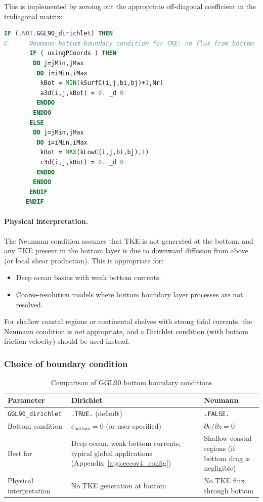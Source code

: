 \documentclass[12pt,letterpaper]{article}
\begin{document}
This is implemented by zeroing out the appropriate off-diagonal coefficient in the tridiagonal matrix:

\begin{lstlisting}[language=Fortran,caption={(ggl90\_calc.F:L722--739) Neumann bottom BC}]
      IF (.NOT.GGL90_dirichlet) THEN
C      Neumann bottom boundary condition for TKE: no flux from bottom
       IF ( usingPCoords ) THEN
        DO j=jMin,jMax
         DO i=iMin,iMax
          kBot = MIN(kSurfC(i,j,bi,bj)+1,Nr)
          a3d(i,j,kBot) = 0. _d 0
         ENDDO
        ENDDO
       ELSE
        DO j=jMin,jMax
         DO i=iMin,iMax
          kBot = MAX(kLowC(i,j,bi,bj),1)
          c3d(i,j,kBot) = 0. _d 0
         ENDDO
        ENDDO
       ENDIF
      ENDIF
\end{lstlisting}

\paragraph{Physical interpretation.} The Neumann condition assumes that TKE is not generated at the bottom, and any TKE present in the bottom layer is due to downward diffusion from above (or local shear production). This is appropriate for:
\begin{itemize}
\item Deep ocean basins with weak bottom currents.
\item Coarse-resolution models where bottom boundary layer processes are not resolved.
\end{itemize}

For shallow coastal regions or continental shelves with strong tidal currents, the Neumann condition is \emph{not} appropriate, and a Dirichlet condition (with bottom friction velocity) should be used instead.

\subsubsection{Choice of boundary condition}

\begin{table}[ht]
\centering
\caption{Comparison of GGL90 bottom boundary conditions}
\label{tab:bottom_bc}
\begin{tabular}{lp{5cm}p{5cm}}
\toprule
\textbf{Parameter} & \textbf{Dirichlet} & \textbf{Neumann} \\
\midrule
\verb|GGL90_dirichlet| & \verb|.TRUE.| (default) & \verb|.FALSE.| \\
\addlinespace
Bottom condition & $e_{\text{bottom}} = 0$ (or user-specified) & $\partial e/\partial z = 0$ \\
\addlinespace
Best for & Deep ocean, weak bottom currents, typical global applications (Appendix~\ref{app:eccov4_config}) & Shallow coastal regions (if bottom drag is negligible) \\
\addlinespace
Physical interpretation & No TKE generation at bottom & No TKE flux through bottom \\
\bottomrule
\end{tabular}
\end{table}
\end{document}
